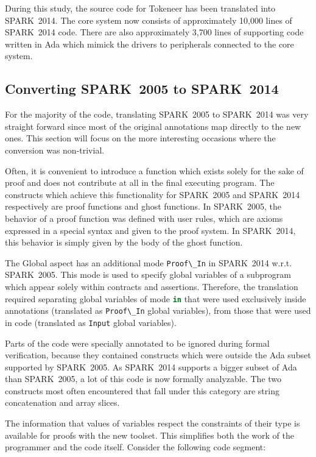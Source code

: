 \documentclass[10pt,a4paper,twocolumn]{article}
\newcommand{\oldspark}{SPARK~2005\xspace}
\newcommand{\newspark}{SPARK~2014\xspace}
\newcommand{\wrt}{w.r.t.\xspace}
\newcommand{\SPARK}[1]{\lstinline[language=Ada,basicstyle={\footnotesize
      \sffamily},framesep=0pt]$#1$}
\begin{document}
During this study, the source code for Tokeneer has been translated
into \newspark. The core system now consists of approximately 10,000
lines of \newspark code. There are also approximately 3,700 lines of
supporting code written in Ada which mimick the drivers to
peripherals connected to the core system.

\subsection{Converting \oldspark to \newspark}

For the majority of the code, translating \oldspark to \newspark was
very straight forward since most of the original annotations map
directly to the new ones. This section will focus on the more
interesting occasions where the conversion was non-trivial.

Often, it is convenient to introduce a function which exists
solely for the sake of proof and does not contribute at all in
the final executing program. The constructs which achieve this
functionality for \oldspark and \newspark respectively are proof
functions and ghost functions. In \oldspark, the behavior of a proof
function was defined with user rules, which are axioms expressed in a special
syntax and given to the proof system. In \newspark, this
behavior is simply given by the body of the ghost function.

The Global aspect has an additional mode \SPARK{Proof\_In} in \newspark \wrt
\oldspark. This mode is used to specify global variables of a subprogram which
appear solely within contracts and assertions. Therefore, the translation
required separating global variables of mode \SPARK{in} that were used
exclusively inside annotations (translated as \SPARK{Proof\_In} global
variables), from those that were used in code (translated as \SPARK{Input}
global variables).

Parts of the code were specially annotated to be ignored during formal
verification, because they contained constructs which were outside the Ada
subset supported by \oldspark. As \newspark supports a bigger subset of Ada
than \oldspark, a lot of this code is now formally analyzable. The two
constructs most often encountered that fall under this category are string
concatenation and array slices.

The information that values of variables respect the constraints of their type
is available for proofs with the new toolset. This simplifies both the work of
the programmer and the code itself. Consider the following code segment:
\end{document}
